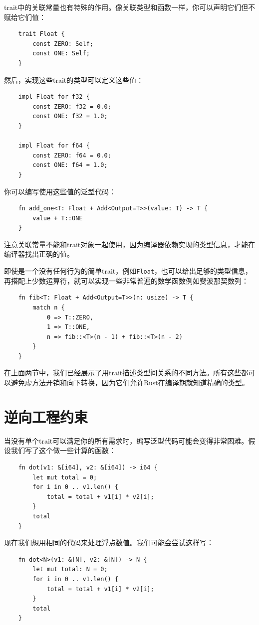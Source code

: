 trait中的关联常量也有特殊的作用。像关联类型和函数一样，你可以声明它们但不赋给它们值：
\begin{verbatim}
    trait Float {
        const ZERO: Self;
        const ONE: Self;
    }
\end{verbatim}

然后，实现这些trait的类型可以定义这些值：
\begin{verbatim}
    impl Float for f32 {
        const ZERO: f32 = 0.0;
        const ONE: f32 = 1.0;
    }

    impl Float for f64 {
        const ZERO: f64 = 0.0;
        const ONE: f64 = 1.0;
    }
\end{verbatim}

你可以编写使用这些值的泛型代码：
\begin{verbatim}
    fn add_one<T: Float + Add<Output=T>>(value: T) -> T {
        value + T::ONE
    }
\end{verbatim}

注意关联常量不能和trait对象一起使用，因为编译器依赖实现的类型信息，才能在编译器找出正确的值。

即使是一个没有任何行为的简单trait，例如\texttt{Float}，也可以给出足够的类型信息，再搭配上少数运算符，就可以实现一些非常普遍的数学函数例如斐波那契数列：
\begin{verbatim}
    fn fib<T: Float + Add<Output=T>>(n: usize) -> T {
        match n {
            0 => T::ZERO,
            1 => T::ONE,
            n => fib::<T>(n - 1) + fib::<T>(n - 2)
        }
    }
\end{verbatim}

在上面两节中，我们已经展示了用trait描述类型间关系的不同方法。所有这些都可以避免虚方法开销和向下转换，因为它们允许Rust在编译期就知道精确的类型。

\section{逆向工程约束}\label{RevBound}

当没有单个trait可以满足你的所有需求时，编写泛型代码可能会变得非常困难。假设我们写了这个做一些计算的函数：
\begin{verbatim}
    fn dot(v1: &[i64], v2: &[i64]) -> i64 {
        let mut total = 0;
        for i in 0 .. v1.len() {
            total = total + v1[i] * v2[i];
        }
        total
    }
\end{verbatim}

现在我们想用相同的代码来处理浮点数值。我们可能会尝试这样写：
\begin{verbatim}
    fn dot<N>(v1: &[N], v2: &[N]) -> N {
        let mut total: N = 0;
        for i in 0 .. v1.len() {
            total = total + v1[i] * v2[i];
        }
        total
    }
\end{verbatim}


